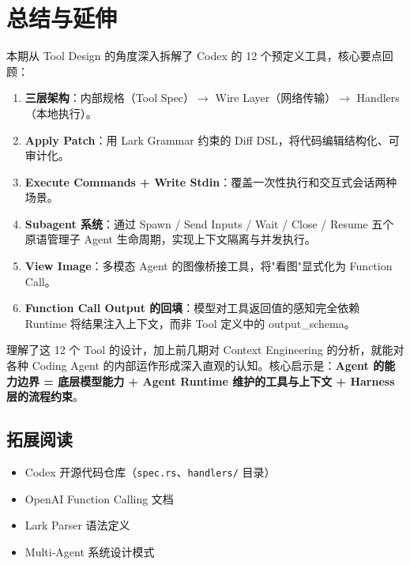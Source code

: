 \section{总结与延伸}

本期从 Tool Design 的角度深入拆解了 Codex 的 12 个预定义工具，核心要点回顾：

\begin{enumerate}
    \item \textbf{三层架构}：内部规格（Tool Spec）$\rightarrow$ Wire Layer（网络传输）$\rightarrow$ Handlers（本地执行）。
    \item \textbf{Apply Patch}：用 Lark Grammar 约束的 Diff DSL，将代码编辑结构化、可审计化。
    \item \textbf{Execute Commands + Write Stdin}：覆盖一次性执行和交互式会话两种场景。
    \item \textbf{Subagent 系统}：通过 Spawn / Send Inputs / Wait / Close / Resume 五个原语管理子 Agent 生命周期，实现上下文隔离与并发执行。
    \item \textbf{View Image}：多模态 Agent 的图像桥接工具，将"看图"显式化为 Function Call。
    \item \textbf{Function Call Output 的回填}：模型对工具返回值的感知完全依赖 Runtime 将结果注入上下文，而非 Tool 定义中的 output\_schema。
\end{enumerate}

理解了这 12 个 Tool 的设计，加上前几期对 Context Engineering 的分析，就能对各种 Coding Agent 的内部运作形成深入直观的认知。核心启示是：\textbf{Agent 的能力边界 = 底层模型能力 + Agent Runtime 维护的工具与上下文 + Harness 层的流程约束}。

\subsection{拓展阅读}

\begin{itemize}
    \item Codex 开源代码仓库（\texttt{spec.rs}、\texttt{handlers/} 目录）
    \item OpenAI Function Calling 文档
    \item Lark Parser 语法定义
    \item Multi-Agent 系统设计模式
\end{itemize}



